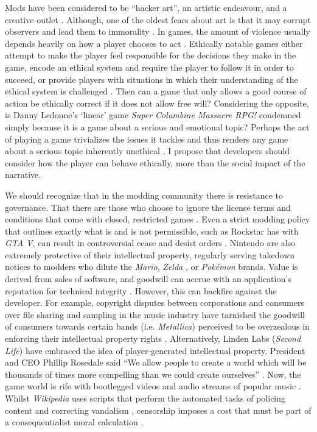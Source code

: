 \documentclass{scrartcl}
\begin{document}
Mods have been considered to be ``hacker art'', an artistic endeavour, and a creative outlet \cite{sotamaa2010game}. Although, one of the oldest fears about art is that it may corrupt observers and lead them to immorality \cite{schulzke2009moral}. In games, the amount of violence usually depends heavily on how a player chooses to act \cite{schulzke2010defending}. Ethically notable games either attempt to make the player feel responsible for the decisions they make in the game, encode an ethical system and require the player to follow it in order to succeed, or provide players with situations in which their understanding of the ethical system is challenged \cite{zagal2009ethically}. Then can a game that only allows a good course of action be ethically correct if it does not allow free will? Considering the opposite, is Danny Ledonne's `linear' game \textit{Super Columbine Massacre RPG!} condemned simply because it is a game about a serious and emotional topic? Perhaps the act of playing a game trivializes the issues it tackles and thus renders any game about a serious topic inherently unethical \cite{zagal2009ethically}. I propose that developers should consider how the player can behave ethically, more than the social impact of the narrative.

We should recognize that in the modding community there is resistance to governance. That there are those who choose to ignore the license terms and conditions that come with closed, restricted games \cite{scacchi2010computer}. Even a strict modding policy that outlines exactly what is and is not permissible, such as Rockstar has with \textit{GTA V}, can result in controversial cease and desist orders \cite{gta1}. Nintendo are also extremely protective of their intellectual property, regularly serving takedown notices to modders who dilute the \textit{Mario}, \textit{Zelda} \cite{nintendo1}, or \textit{Pok{\'e}mon} \cite{pokemon1} brands. Value is derived from sales of software, and goodwill can accrue with an application's reputation for technical integrity \cite{herman2006your}. However, this can backfire against the developer. For example, copyright disputes between corporations and consumers over file sharing and sampling in the music industry have tarnished the goodwill of consumers towards certain bands (i.e. \textit{Metallica}) perceived to be overzealous in enforcing their intellectual property rights \cite{herman2006your}. 
Alternatively, Linden Labs (\textit{Second Life}) have embraced the idea of player-generated intellectual property. President and CEO Phillip Rosedale said ``We allow people to create a world which will be thousands of times more compelling than we could create ourselves'' \cite{herman2006your}. Now, the game world is rife with bootlegged videos and audio streams of popular music \cite{herman2006your}. Whilst \textit{Wikipedia} uses scripts that perform the automated tasks of policing content and correcting vandalism \cite{hong2014becoming}, censorship imposes a cost that must be part of a consequentialist moral calculation \cite{schulzke2010defending}.
\end{document}
